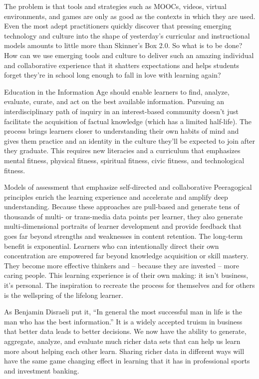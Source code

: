 The problem is that tools and strategies such as MOOCs, videos, virtual
environments, and games are only as good as the contexts in which they
are used. Even the most adept practitioners quickly discover that
pressing emerging technology and culture into the shape of yesterday's
curricular and instructional models amounts to little more than
Skinner's Box 2.0. So what is to be done? How can we use emerging tools
and culture to deliver such an amazing individual and collaborative
experience that it shatters expectations and helps students forget
they're in school long enough to fall in love with learning again?

Education in the Information Age should enable learners to find,
analyze, evaluate, curate, and act on the best available information.
Pursuing an interdisciplinary path of inquiry in an interest-based
community doesn't just facilitate the acquisition of factual knowledge
(which has a limited half-life). The process brings learners closer to
understanding their own habits of mind and gives them practice and an
identity in the culture they'll be expected to join after they graduate.
This requires new literacies and a curriculum that emphasizes mental
fitness, physical fitness, spiritual fitness, civic fitness, and
technological fitness.

Models of assessment that emphasize self-directed and collaborative
Peeragogical principles enrich the learning experience and accelerate
and amplify deep understanding. Because these approaches are pull-based
and generate tens of thousands of multi- or trans-media data points per
learner, they also generate multi-dimensional portraits of learner
development and provide feedback that goes far beyond strengths and
weaknesses in content retention. The long-term benefit is exponential.
Learners who can intentionally direct their own concentration are
empowered far beyond knowledge acquisition or skill mastery. They become
more effective thinkers and -- because they are invested -- more caring
people. This learning experience is of their own making: it isn't
business, it's personal. The inspiration to recreate the process for
themselves and for others is the wellspring of the lifelong learner.

As Benjamin Disraeli put it, ``In general the most successful man in
life is the man who has the best information.'' It is a widely accepted
truism in business that better data leads to better decisions. We now
have the ability to generate, aggregate, analyze, and evaluate much
richer data sets that can help us learn more about helping each other
learn. Sharing richer data in different ways will have the same game
changing effect in learning that it has in professional sports and
investment banking.

